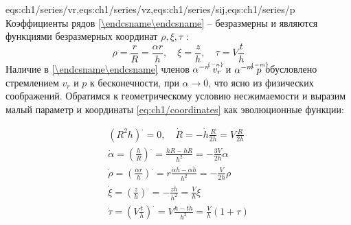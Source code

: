 \expandafter\gdef\csname eqs:ch1/series\endcsname{eqs:ch1/series/vr,eqs:ch1/series/vz,eqs:ch1/series/sij,eqs:ch1/series/p}
Коэффициенты рядов \cref{\csname eqs:ch1/series\endcsname} -- безразмерны и являются функциями безразмерных координат $\rho, \xi, \tau$ :
\begin{equation}
  \label{eq:ch1/coordinates}
  \rho = \frac{r}{R} = \frac{\alpha r}{h}, \quad \xi = \frac{z}{h}, \quad \tau = V \frac{t}{h}
\end{equation}
Наличие в \cref{\csname eqs:ch1/series\endcsname} членов $\alpha^{-n} \; \uindex{v}{-n}_{r}$ и $\alpha^{-m} \; \uindex{p}{-m}$ обусловлено стремлением $v_{r}$ и $p$ к бесконечности, при $\alpha\rightarrow 0$, что ясно из физических соображений.
Обратимся к геометрическому условию несжимаемости и выразим малый параметр и координаты \cref{eq:ch1/coordinates} как эволюционные функции:

\begin{gather}
  \left(R^2 h\right)^. = 0, \quad \dot{R} = -\dot{h} \frac{R}{2h}= V \frac{R}{2h}\nonumber
  \\
  \dot{\alpha} = \left(\frac{h}{R}\right)^. = \frac{\dot{h}R - h\dot{R}}{h^2} = -\frac{3 V}{2 h} \alpha
  \\
  \dot{\rho} = \left(\frac{\alpha r}{h}\right)^. = r \frac{\dot{\alpha} h - \alpha \dot{h}}{h^2} = -\frac{V}{2h}\rho
  \\
  \dot{\xi} = \left(\frac{z}{h}\right)^. = -\frac{z \dot{h}}{h^2} = \frac{V}{h}\xi
  \\
  \dot{\tau} = \left(V \frac{t}{h}\right)^. = V \frac{h - t\dot{h}}{h^2} = \frac{V}{h} \left(1+\tau\right)
\end{gather}

